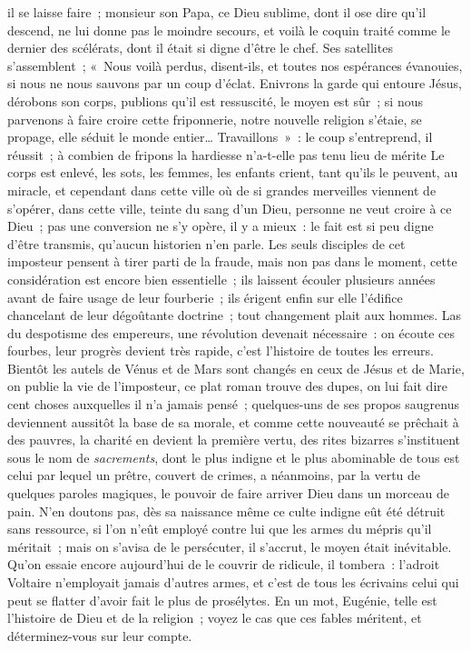 \documentclass[french,twoside]{book} %
\begin{document}
il se laisse faire ; monsieur son Papa, ce Dieu sublime, dont il ose dire qu’il descend, ne lui donne pas le moindre secours, et voilà le coquin traité comme le dernier des scélérats, dont il était si digne d’être le chef. Ses satellites s’assemblent ; « Nous voilà perdus, disent-ils, et toutes nos espérances évanouies, si nous ne nous sauvons par un coup d’éclat. Enivrons la garde qui entoure Jésus, dérobons son corps, publions qu’il est ressuscité, le moyen est sûr ; si nous parvenons à faire croire cette friponnerie, notre nouvelle religion s’étaie, se propage, elle séduit le monde entier… Travaillons » : le coup s’entreprend, il réussit ; à combien de fripons la hardiesse n’a-t-elle pas tenu lieu de mérite Le corps est enlevé, les sots, les femmes, les enfants crient, tant qu’ils le peuvent, au miracle, et cependant dans cette ville où de si grandes merveilles viennent de s’opérer, dans cette ville, teinte du sang d’un Dieu, personne ne veut croire à ce Dieu ; pas une conversion ne s’y opère, il y a mieux : le fait est si peu digne d’être transmis, qu’aucun historien n’en parle. Les seuls disciples de cet imposteur pensent à tirer parti de la fraude, mais non pas dans le moment, cette considération est encore bien essentielle ; ils laissent écouler plusieurs années avant de faire usage de leur fourberie ; ils érigent enfin sur elle l’édifice chancelant de leur dégoûtante doctrine ; tout changement plait aux hommes. Las du despotisme des empereurs, une révolution devenait nécessaire : on écoute ces fourbes, leur progrès devient très rapide, c’est l’histoire de toutes les erreurs. Bientôt les autels de Vénus et de Mars sont changés en ceux de Jésus et de Marie, on publie la vie de l’imposteur, ce plat roman trouve des dupes, on lui fait dire cent choses auxquelles il n’a jamais pensé ; quelques-uns de ses propos saugrenus deviennent aussitôt la base de sa morale, et comme cette nouveauté se prêchait à des pauvres, la charité en devient la première vertu, des rites bizarres s’instituent sous le nom de {\itshape sacrements}, dont le plus indigne et le plus abominable de tous est celui par lequel un prêtre, couvert de crimes, a néanmoins, par la vertu de quelques paroles magiques, le pouvoir de faire arriver Dieu dans un morceau de pain. N’en doutons pas, dès sa naissance même ce culte indigne eût été détruit sans ressource, si l’on n’eût employé contre lui que les armes du mépris qu’il méritait ; mais on s’avisa de le persécuter, il s’accrut, le moyen était inévitable. Qu’on essaie encore aujourd’hui de le couvrir de ridicule, il tombera : l’adroit Voltaire n’employait jamais d’autres armes, et c’est de tous les écrivains celui qui peut se flatter d’avoir fait le plus de prosélytes. En un mot, Eugénie, telle est l’histoire de Dieu et de la religion ; voyez le cas que ces fables méritent, et déterminez-vous sur leur compte.\par
\end{document}
